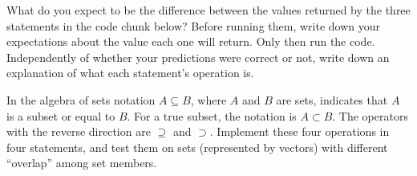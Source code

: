 \documentclass[krantz2]{krantz}\usepackage{knitr}
\begin{document}
\begin{playground}
What do you expect to be the difference between the values returned by the three statements in the code chunk below? Before running them, write down your expectations about the value each one will return. Only then run the code. Independently of whether your predictions were correct or not, write down an explanation of what each statement's operation is.

\begin{knitrout}\footnotesize
{}\color{fgcolor}\begin{kframe}
\begin{alltt}
\hlstd{(}\hlstd{(}\hlstd{,} \hlstd{,} 
\hlstd{(}\hlstd{(}\hlstd{,} \hlstd{,} 
\hlstd{(}\hlstd{,} \hlstd{,} 
\end{alltt}
\end{kframe}
\end{knitrout}

In the algebra of sets notation $A \subseteq B$, where $A$ and $B$ are sets, indicates that $A$ is a subset or equal to $B$. For a true subset, the notation is $A \subset B$. The operators with the reverse direction are $\supseteq$ and $\supset$. Implement these four operations in four \Rlang statements, and test them on sets (represented by \Rlang vectors) with different ``overlap'' among set members.

\end{playground}
\end{document}
